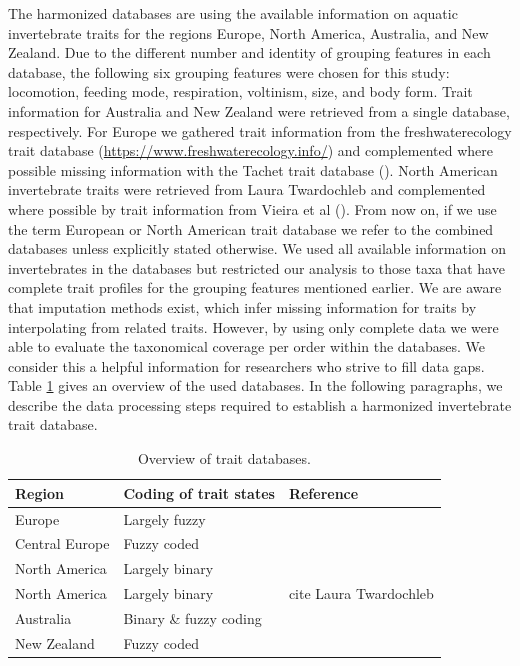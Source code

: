 \documentclass{article}
\begin{document}
The harmonized databases are using the available information on aquatic invertebrate
traits for the regions Europe, North America, Australia, and New Zealand. 
Due to the different number and identity of grouping features in each database, 
the following six grouping features were chosen for this study: locomotion, feeding mode, 
respiration, voltinism, size, and body form. 
Trait information for Australia and New Zealand were retrieved from 
a single database, respectively. For Europe we gathered trait information from the 
freshwaterecology trait database (\url{https://www.freshwaterecology.info/}) 
and complemented where possible missing information with the 
Tachet trait database (\cite{usseglio-polatera_biomonitoring_2000}). 
North American invertebrate traits were retrieved from Laura Twardochleb and 
complemented where possible by trait information from Vieira et al (\cite{vieira_database_nodate}).
From now on, if we use the term European or North American trait database we refer to the combined 
databases unless explicitly stated otherwise.
We used all available information on invertebrates in the databases but restricted
our analysis to those taxa that have complete trait profiles for the grouping features
mentioned earlier. We are aware that imputation methods exist, which infer missing 
information for traits by interpolating from related traits. %
However, by using only complete data we were able to evaluate the taxonomical coverage
per order within the databases. We consider this a helpful information for researchers
who strive to fill data gaps.
Table \ref{tab:trait_databases} gives an overview of the used databases. 
In the following paragraphs, we describe the data processing steps required to 
establish a harmonized invertebrate trait database. 

\begin{table}[H]
    \centering
    \caption{Overview of trait databases.}
    \label{tab:trait_databases}
    \begin{tabular}{lll}
    \toprule
   Region & Coding of trait states & Reference \\ 
    \hline
   Europe & Largely fuzzy & \cite{schmidt-kloiber_www.freshwaterecology.info_2015}\\ 
   Central Europe & Fuzzy coded & \cite{usseglio-polatera_biomonitoring_2000} \\ 
   North America & Largely binary & \cite{vieira_database_nodate}\\
   North America & Largely binary & cite Laura Twardochleb \\
   Australia & Binary \& fuzzy coding  & \cite{kefford_ben_AST_DB_2019}\\ 
   New Zealand & Fuzzy coded & \\ %
    \bottomrule
    \end{tabular}
\end{table}
\end{document}
